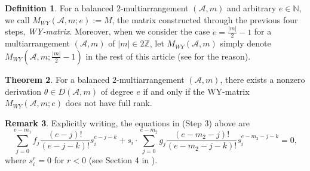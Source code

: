 \documentclass[12pt]{amsart}
\theoremstyle{definition}
\newtheorem{definition}{Definition}[section]
\newtheorem{theorem}[definition]{Theorem}
\newtheorem{remark}[definition]{Remark}
\newcommand{\NN}{\mathbb{N}}
\newcommand{\ZZ}{\mathbb{Z}}
\newcommand{\AAA}{\mathcal{A}}
\begin{document}
\begin{definition}
\label{definition:WY-matrix}
For a balanced $2$-multiarrangement $(\AAA,m)$ and arbitrary $e\in\NN$, 
we call $M_{WY}(\AAA,m; e):=M$, 
the matrix constructed through the previous four steps, 
\emph{WY-matrix}. %
%
Moreover, 
when we consider the case $e=\frac{|m|}{2}-1$ for a multiarrangement $(\AAA,m)$ of $|m|\in2\ZZ$, 
let $M_{WY}(\AAA,m)$ simply denote $M_{WY}(\AAA,m;\frac{|m|}{2}-1)$ 
in the rest of this article (see  for the reason). 
\end{definition}
%
\begin{theorem}
\label{theorem:WY-matrix}
For a balanced $2$-multiarrangement $(\AAA,m)$, 
there exists a nonzero derivation 
$\theta\in D(\AAA,m)$ of degree $e$ 
if and only if the WY-matrix 
$M_{WY}(\AAA,m; e)$ does not have full rank. 
\end{theorem}
\begin{remark}\label{remark:elements of WY-matrix}
Explicitly writing, the equations in (Step 3) above are 
$$\sum_{j=0}^{e-m_1}f_j\frac{(e-j)!}{(e-j-k)!}s_i^{e-j-k} 
+ s_i\cdot \sum_{j=0}^{e-m_2}g_j\frac{(e-m_2-j)!}{(e-m_2-j-k)!}s_i^{e-m_2-j-k}=0,$$ 
where $s_i^r=0$ for $r<0$ (see Section 4 in \cite{Wakefield-Yuzvinsky}). 
\end{remark}
%
%   
\end{document}
